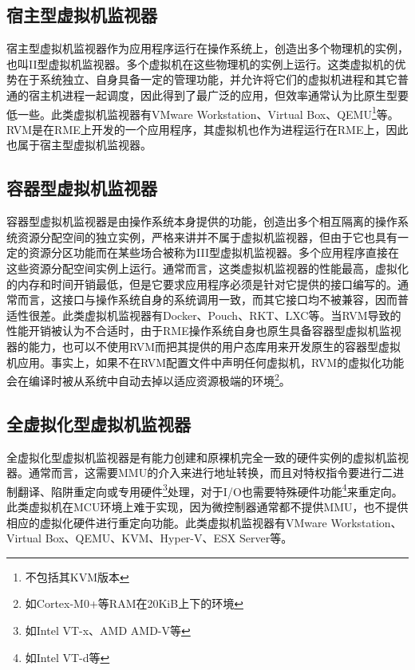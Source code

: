 \subsection{宿主型虚拟机监视器}\label{subsec:1-2-2}

宿主型虚拟机监视器作为应用程序运行在操作系统上，创造出多个物理机的实例，也叫II型虚拟机监视器。多个虚拟机在这些物理机的实例上运行。这类虚拟机的优势在于系统独立、自身具备一定的管理功能，并允许将它们的虚拟机进程和其它普通的宿主机进程一起调度，因此得到了最广泛的应用，但效率通常认为比原生型要低一些。此类虚拟机监视器有VMware Workstation、Virtual Box、QEMU\footnote{不包括其KVM版本}等。RVM是在RME上开发的一个应用程序，其虚拟机也作为进程运行在RME上，因此也属于宿主型虚拟机监视器。

\subsection{容器型虚拟机监视器}\label{subsec:1-2-3}

容器型虚拟机监视器是由操作系统本身提供的功能，创造出多个相互隔离的操作系统资源分配空间的独立实例，严格来讲并不属于虚拟机监视器，但由于它也具有一定的资源分区功能而在某些场合被称为III型虚拟机监视器。多个应用程序直接在这些资源分配空间实例上运行。通常而言，这类虚拟机监视器的性能最高，虚拟化的内存和时间开销最低，但是它要求应用程序必须是针对它提供的接口编写的。通常而言，这接口与操作系统自身的系统调用一致，而其它接口均不被兼容，因而普适性很差。此类虚拟机监视器有Docker、Pouch、RKT、LXC等。当RVM导致的性能开销被认为不合适时，由于RME操作系统自身也原生具备容器型虚拟机监视器的能力，也可以不使用RVM而把其提供的用户态库用来开发原生的容器型虚拟机应用。事实上，如果不在RVM配置文件中声明任何虚拟机，RVM的虚拟化功能会在编译时被从系统中自动去掉以适应资源极端的环境\footnote{如Cortex-M0+等RAM在20KiB上下的环境}。

\subsection{全虚拟化型虚拟机监视器}\label{subsec:1-2-4}

全虚拟化型虚拟机监视器是有能力创建和原裸机完全一致的硬件实例的虚拟机监视器。通常而言，这需要MMU的介入来进行地址转换，而且对特权指令要进行二进制翻译、陷阱重定向或专用硬件\footnote{如Intel VT-x、AMD AMD-V等}处理，对于I/O也需要特殊硬件功能\footnote{如Intel VT-d等}来重定向。此类虚拟机在MCU环境上难于实现，因为微控制器通常都不提供MMU，也不提供相应的虚拟化硬件进行重定向功能。此类虚拟机监视器有VMware Workstation、Virtual Box、QEMU、KVM、Hyper-V、ESX Server等。

